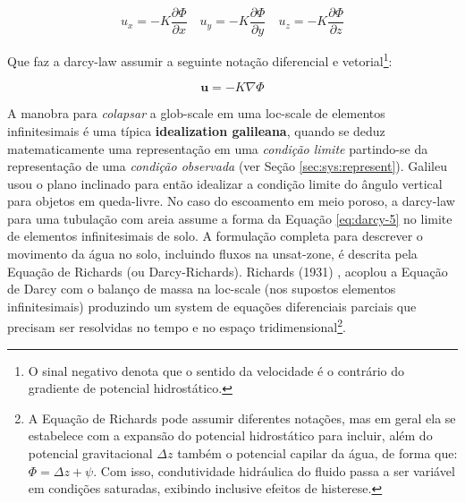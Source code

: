 \documentclass[./main.tex]{subfiles}
\begin{document}
\begin{linenomath*}
\begin{equation}
\label{eq:darcy-4}
u_x = - K\frac{\partial \Phi}{\partial x} \quad 
u_y = - K\frac{\partial \Phi}{\partial y} \quad 
u_z = - K\frac{\partial \Phi}{\partial z}
\end{equation}
\end{linenomath*}
\noindent Que faz a \gls{darcy-law} assumir a seguinte notação diferencial e vetorial\footnote{O sinal negativo denota que o sentido da velocidade é o contrário do gradiente de potencial hidrostático.}:
\begin{linenomath*}
\begin{equation}
\label{eq:darcy-5}
\textbf{u} = - K \nabla \Phi
\end{equation}
\end{linenomath*}

\par A manobra para \textit{colapsar} a \gls{glob-scale} em uma \gls{loc-scale} de elementos infinitesimais é uma típica \textbf{\gls{idealization} galileana}, quando se deduz matematicamente uma representação em uma \textit{condição limite} partindo-se da representação de uma \textit{condição observada}  (ver Seção \ref{sec:sys:represent}). Galileu usou o plano inclinado para então idealizar a condição limite do ângulo vertical para objetos em queda-livre. No caso do escoamento em meio poroso, a \gls{darcy-law} para uma tubulação com areia assume a forma da Equação \eqref{eq:darcy-5} no limite de elementos infinitesimais de solo. A formulação completa para descrever o movimento da água no solo, incluindo fluxos na \gls{unsat-zone}, é descrita pela Equação de Richards (ou Darcy-Richards). Richards (1931) \cite{Richards1931a}, acoplou a Equação de Darcy com o balanço de massa na \gls{loc-scale} (nos supostos elementos infinitesimais) produzindo um \gls{system} de equações diferenciais parciais que precisam ser resolvidas no tempo e no espaço tridimensional\footnote{A Equação de Richards pode assumir diferentes notações, mas em geral ela se estabelece com a expansão do potencial hidrostático para incluir, além do potencial gravitacional $\Delta z$ também o potencial capilar da água, de forma que: $\Phi = \Delta z + \psi$. Com isso, condutividade hidráulica do fluido passa a ser variável em condições saturadas, exibindo inclusive efeitos de histerese.}. 
\end{document}
